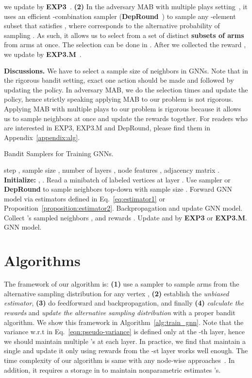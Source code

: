 \documentclass{article}
\begin{document}
we update  by 
\textbf{EXP3}~\cite{auer2002nonstochastic}.
\textbf{(2)} In the adversary MAB with multiple plays 
setting~\cite{uchiya2010algorithms},
it uses an efficient -combination sampler 
(\textbf{DepRound}~\cite{gandhi2006dependent})
 to sample any -element subset 
 that satisfies
,
where  corresponds to the alternative probability
of sampling . As such, it allows us
to select from a set of 
distinct \textbf{subsets of arms}
from  arms at once.
The selection can be done in . 
After we collected the reward 
,
we update  by \textbf{EXP3.M}~\cite{uchiya2010algorithms}.

{\bfseries Discussions.} We have to select a sample
size of  neighbors in GNNs. Note that in the 
rigorous bandit setting, exact one action should 
be made and followed by updating
the policy. In adversary MAB, we do the selection  times and 
update the policy, hence strictly speaking applying MAB to our
problem is not rigorous. Applying MAB with multiple plays 
to our problem is rigorous because it allows
us to sample  neighbors at once and update
the rewards together. For readers who are interested in 
EXP3, EXP3.M and DepRound, please find them in 
Appendix~\ref{appendix:alg}.


\begin{algorithm}
\caption{Bandit Samplers for Training GNNs.}
\label{alg:train_gnn}
\begin{algorithmic}[1]
\Require step , sample size , number of layers , node features , adjacency matrix .
\State \textbf{Initialize:} , 
. 
\State Read a minibatch of labeled vertices at layer .
\State Use sampler  or \textbf{DepRound} to sample neighbors top-down with sample size .
\State Forward GNN model via estimators defined in Eq.~\eqref{eq:estimator1} or Proposition~\ref{proposition:estimator2}.
\State Backpropagation and update GNN model.
\State Collect 's  sampled neighbors
, and rewards . 
\State Update  and  by \textbf{EXP3} 
or \textbf{EXP3.M}.
\EndFor
\EndFor
\State \Return GNN model.
\end{algorithmic}
\end{algorithm}

\section{Algorithms}
The framework of our algorithm is: \textbf{(1)} 
use a sampler  to sample  arms from the 
alternative sampling distribution  for any vertex ,
\textbf{(2)} establish the \emph{unbiased 
estimator}, \textbf{(3)} do feedforward and 
backpropagation, and finally \textbf{(4)}
\emph{calculate the rewards} and \emph{update the alternative
sampling distribution}
with a proper bandit algorithm. We show this framework
in Algorithm~\ref{alg:train_gnn}. Note that
the variance w.r.t  in Eq.~\eqref{eqn:pseudo-variance} 
is defined only at the -th layer, hence
we should maintain multiple 's at each layer.
In practice, we find that maintain a single  
and update it only using rewards from the -st 
layer works well enough. The time complexity of our algorithm
is same with any node-wise 
approaches~\cite{hamilton2017inductive}. In addition, it requires
a storage in  to maintain nonparametric
estimates 's.
\end{document}
